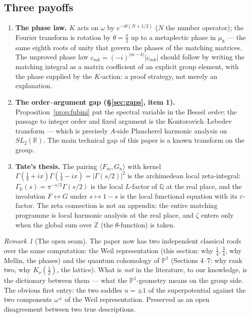 \documentclass[11pt]{article}
\theoremstyle{definition}
\theoremstyle{remark}
\newtheorem{remark}[proposition]{Remark}
\newcommand{\R}{\mathbb{R}}
\newcommand{\Z}{\mathbb{Z}}
\newcommand{\Q}{\mathbb{Q}}
\newcommand{\PP}{\mathbb{P}}
\newcommand{\G}{\Gamma}
\begin{document}
\subsection{Three payoffs}

\begin{enumerate}
\item \textbf{The phase law.} $K$ acts on $\omega$ by
$e^{-i\theta(N + 1/2)}$ ($N$ the number operator); the Fourier
transform is rotation by $\theta = \tfrac\pi2$ up to a metaplectic
phase in $\mu_8$ --- the same eighth roots of unity that govern
the phases of the matching matrices. The unproved phase law
$c_{mk} = (-i)^{|m-k|}|c_{mk}|$ should follow by writing the
matching integral as a matrix coefficient of an explicit group
element, with the phase supplied by the $K$-action: a proof
strategy, not merely an explanation.
\item \textbf{The order--argument gap
(\S\ref{sec:gaps}, item 1).} Proposition~\ref{prop:fubini} put the
spectral variable in the Bessel \emph{order}; the passage to
integer order and fixed argument is the Kontorovich--Lebedev
transform --- which is precisely $A$-side Plancherel harmonic
analysis on $SL_2(\R)$. The main technical gap of this paper is a
known transform on the group.
\item \textbf{Tate's thesis.} The pairing
$\langle F_m, G_n\rangle$ with kernel
$\G(\tfrac14+ix)\G(\tfrac14-ix) = |\G(s/2)|^2$ is the archimedean
local zeta-integral: $\G_\R(s) = \pi^{-s/2}\G(s/2)$ is the local
$L$-factor of $\Q$ at the real place, and the involution
$F \leftrightarrow G$ under $s \mapsto 1-s$ is the local
functional equation with its $\varepsilon$-factor. The zeta
connection is not an appendix: the entire matching programme is
local harmonic analysis at the real place, and $\zeta$ enters only
when the global sum over $\Z$ (the $\theta$-function) is taken.
\end{enumerate}

\begin{remark}[The open seam]
The paper now has two independent classical roofs over the same
computation: the Weil representation (this section: why
$\tfrac14, \tfrac34$, why Mellin, the phases) and the quantum
cohomology of $\PP^1$ (Sections 4--7: why rank two, why
$K_\nu(\tfrac12)$, the lattice). What is \emph{not} in the
literature, to our knowledge, is the dictionary between them ---
what the $\PP^1$-geometry means on the group side. The obvious
first entry: the two saddles $u = \pm1$ of the superpotential
against the two components $\omega^\pm$ of the Weil
representation. Preserved as an open disagreement between two
true descriptions.
\end{remark}
\end{document}

